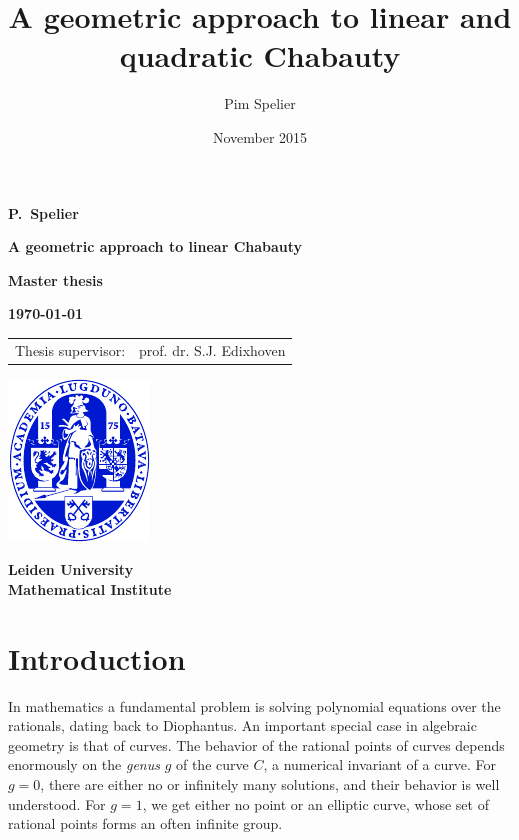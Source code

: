 \documentclass[12pt]{article}
\title{A geometric approach to linear and quadratic Chabauty}
\author{Pim Spelier}
\date{November 2015}
\theoremstyle{plain}
\theoremstyle{definition}
\theoremstyle{remark}
\begin{document}

\vspace*{1em}

\begin{center}

{\Large\bf 
P.\ Spelier
} 

\vspace{1em} 

{\LARGE\bf 
A geometric approach to linear Chabauty
} 

\vspace{10em} 

{\large\bf 
Master thesis
} 

\vspace{1em}

{\large\bf 
\today
}

\vspace{10em} 

{\large\bf
\begin{tabular}{ll}
Thesis supervisor: & prof. dr. S.J. Edixhoven\\
\end{tabular}
}

\vfill

\includegraphics{ulzegel_blauw}\\

\vspace{2em}

{\large\bf 
Leiden University\\
Mathematical Institute\\
}

\end{center}
\thispagestyle{empty}
\newpage
\listoftodos
\tableofcontents
\newpage


\section{Introduction}
\label{section:intro}
In mathematics a fundamental problem is solving polynomial equations over the rationals, dating back to Diophantus. An important special case in algebraic geometry is that of curves. The behavior of the rational points of curves depends enormously on the \textit{genus} $g$ of the curve $C$, a numerical invariant of a curve. For $g = 0$, there are either no or infinitely many solutions, and their behavior is well understood. For $g = 1$, we get either no point or an elliptic curve, whose set of rational points forms an often infinite group.
\end{document}
